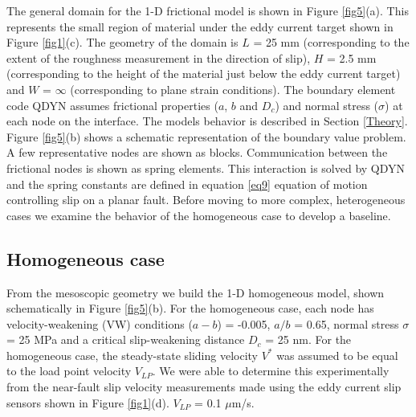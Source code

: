 \documentclass[final,3p, 11pt,authoryear]{elsarticle}
\begin{document}
The general domain for the 1-D frictional model is shown in Figure \ref{fig5}(a). This represents the small region of material under the eddy current target shown in Figure \ref{fig1}(c). The geometry of the domain is $L$ = 25 mm (corresponding to the extent of the roughness measurement in the direction of slip), $H$ = 2.5 mm (corresponding to the height of the material just below the eddy current target) and $W$ = $\infty$ (corresponding to plane strain conditions). The boundary element code QDYN assumes frictional properties ($a$, $b$ and $D_{c}$) and normal stress ($\sigma$) at each node on the interface. The models behavior is described in Section \ref{Theory}. Figure \ref{fig5}(b) shows a schematic representation of the boundary value problem. A few representative nodes are shown as blocks. Communication between the frictional nodes is shown as spring elements. This interaction is solved by QDYN  and the spring constants are defined in equation \eqref{eq9} equation of motion controlling slip on a planar fault. Before moving to more complex, heterogeneous cases we examine the behavior of the homogeneous case to develop a baseline.    

\subsection{Homogeneous case}

From the mesoscopic geometry we build the 1-D homogeneous model, shown schematically in Figure \ref{fig5}(b). For the homogeneous case, each node has velocity-weakening (VW) conditions ($a-b$) = -0.005, $a/b$ = 0.65, normal stress $\sigma$ = 25 MPa and a critical slip-weakening distance $D_{c}$ = 25 nm. For the homogeneous case, the steady-state sliding velocity $V^{*}$ was assumed to be equal to the load point velocity $V_{LP}$. We were able to determine this experimentally from the near-fault slip velocity measurements made using the eddy current slip sensors shown in Figure \ref{fig1}(d). $V_{LP}$ = 0.1 $\mu$m/s.
\end{document}
